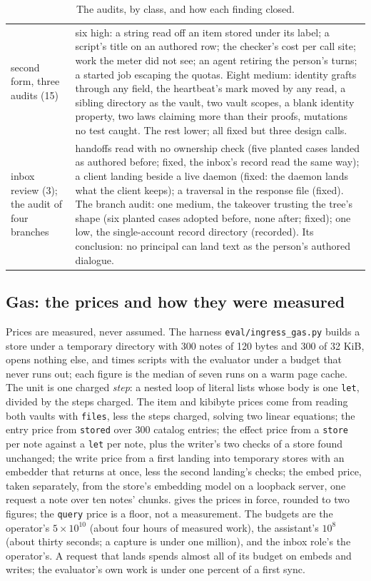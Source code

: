 \documentclass[11pt]{article}
\theoremstyle{plain}
\theoremstyle{definition}
\theoremstyle{remark}
\newcommand{\code}[1]{\texttt{#1}}
\begin{document}
\begin{table}[tp]
\begin{tabular}{>{\raggedright\arraybackslash}p{}>{\raggedright\arraybackslash}p{}}
second form, three audits (15) & six high: a string read off an item stored under its label; a script's title on an authored row; the checker's cost per call site; work the meter did not see; an agent retiring the person's turns; a started job escaping the quotas. Eight medium: identity grafts through any field, the heartbeat's mark moved by any read, a sibling directory as the vault, two vault scopes, a blank identity property, two laws claiming more than their proofs, mutations no test caught. The rest lower; all fixed but three design calls. \\
inbox review (3); the audit of four branches & handoffs read with no ownership check (five planted cases landed as authored before; fixed, the inbox's record read the same way); a client landing beside a live daemon (fixed: the daemon lands what the client keeps); a traversal in the response file (fixed). The branch audit: one medium, the takeover trusting the tree's shape (six planted cases adopted before, none after; fixed); one low, the single-account record directory (recorded). Its conclusion: no principal can land text as the person's authored dialogue. \\
\bottomrule
\end{tabular}
\caption{The audits, by class, and how each finding closed.}
\label{tab:audits}
\end{table}

\subsection{Gas: the prices and how they were measured}

Prices are measured, never assumed. The harness \code{eval/ingress\_gas.py} builds a store under
a temporary directory with 300 notes of 120 bytes and 300 of 32 KiB, opens nothing else, and
times scripts with the evaluator under a budget that never runs out; each figure is the median
of seven runs on a warm page cache. The unit is one charged \emph{step}: a nested loop of
literal lists whose body is one \code{let}, divided by the steps charged. The item and kibibyte
prices come from reading both vaults with \code{files}, less the steps charged, solving two
linear equations; the entry price from \code{stored} over 300 catalog entries; the effect price
from a \code{store} per note against a \code{let} per note, plus the writer's two checks of a
store found unchanged; the write price from a first landing into temporary stores with an
embedder that returns at once, less the second landing's checks; the embed price, taken
separately, from the store's embedding model on a loopback server, one request a note over ten
notes' chunks.  gives the prices in force, rounded to two figures; the
\code{query} price is a floor, not a measurement. The budgets are the operator's
$5 \times 10^{10}$ (about four hours of measured work), the assistant's $10^{8}$ (about thirty
seconds; a capture is under one million), and the inbox role's the operator's. A request that
lands spends almost all of its budget on embeds and writes; the evaluator's own work is under
one percent of a first sync.
\end{document}
